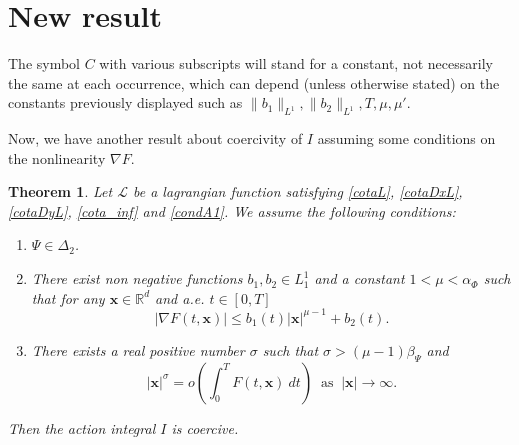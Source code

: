 \documentclass[twoside]{article}
\newtheorem{thm}{Theorem}[section]
\theoremstyle{remark}
\renewcommand{\b}[1]{\boldsymbol{#1}}
\newcommand{\rr}{\mathbb{R}}
\renewcommand{\leq}{\leqslant}
\begin{document}
\section{New result}

The symbol $C$ with various subscripts will stand for a constant, not necessarily the same at each occurrence, which can depend
(unless otherwise stated) on the constants previously displayed such as \linebreak $\|b_1\|_{L^1}, \|b_2\|_{L^1},T,\mu,\mu'$.

Now, we have another result about coercivity of $I$ assuming some conditions on the nonlinearity $\nabla F$. 

\begin{thm}\label{coercitividad-r}
Let  $\mathcal{L}$ be a lagrangian function satisfying \eqref{cotaL}, \eqref{cotaDxL}, \eqref{cotaDyL}, \eqref{cota_inf} and \eqref{condA1}. We assume the following conditions:
\begin{enumerate}
\item $\Psi\in\Delta_2$.
\item There exist  non negative functions  $b_1,b_2 \in L^1_1$ and a constant $1<\mu<\alpha_{\Phi}$  such that 
for any $\b{x}\in\rr^d$ and a.e. $t\in [0,T]$
\begin{equation}\label{holder_cont-mu}
  \left| \nabla F(t,\b{x}) \right|\leq b_1(t)|\b{x}|^{\mu-1}+b_2(t).
\end{equation}
\item There exists a real positive number $\sigma$ such that $\sigma>(\mu-1)\beta_{\Psi}$ and
\begin{equation}\label{propiedad-coercividad-mu}
|\b{x}|^{\sigma}=o\left(\int_{0}^{T}F(t,\b{x})\ dt\right)\;\;\mbox{as}\;\;|\b{x}|\to \infty.
\end{equation}
\end{enumerate}
Then  the action integral $I$ is coercive.
\end{thm}
\end{document}
